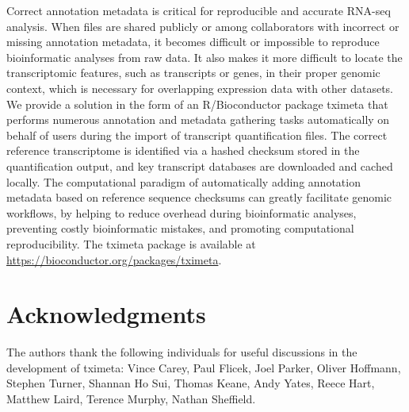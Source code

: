 \documentclass[10pt,letterpaper]{article}
\begin{document}
Correct annotation metadata is critical for reproducible and accurate
RNA-seq analysis. When files are shared publicly or among
collaborators with incorrect or missing annotation metadata, it
becomes difficult or impossible to reproduce bioinformatic analyses
from raw data. It also makes it more difficult to locate the
transcriptomic features, such as transcripts or genes, in their proper
genomic context, which is necessary for overlapping expression data
with other datasets. We provide a solution in the form of an
R/Bioconductor package tximeta that performs numerous annotation and
metadata gathering tasks automatically on behalf of users during the
import of transcript quantification files. The correct reference
transcriptome is identified via a hashed checksum stored in the
quantification output, and key transcript databases are downloaded and
cached locally. The computational paradigm of automatically adding
annotation metadata based on reference sequence checksums can greatly
facilitate genomic workflows, by helping to reduce overhead during
bioinformatic analyses, preventing costly bioinformatic mistakes, and
promoting computational reproducibility.
The tximeta package is
available at \url{https://bioconductor.org/packages/tximeta}.

\linenumbers



\section*{Acknowledgments}

The authors thank the following individuals for useful discussions 
in the development of tximeta: Vince Carey, Paul Flicek, Joel Parker,
Oliver Hoffmann, Stephen Turner, Shannan Ho Sui, Thomas Keane, Andy
Yates, Reece Hart, Matthew Laird, Terence Murphy, Nathan Sheffield.

\nolinenumbers


\end{document}
